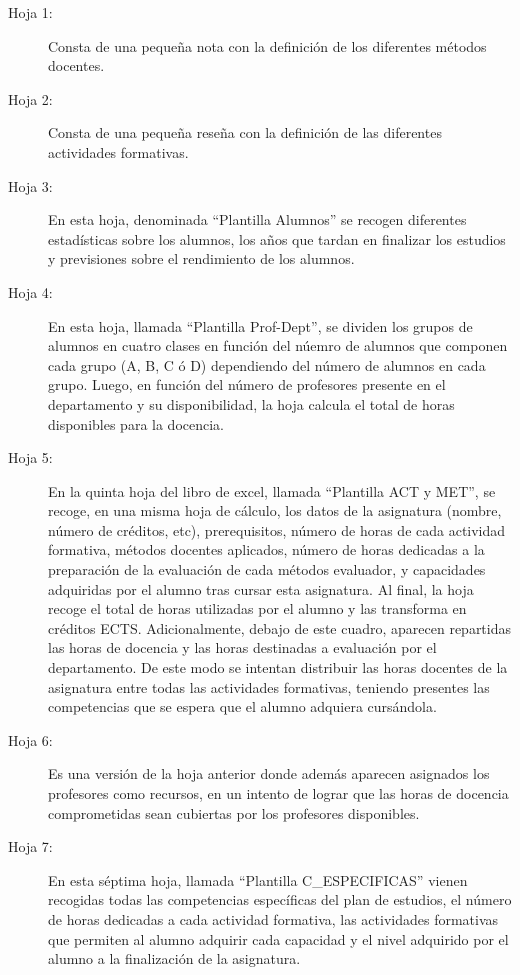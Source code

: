 		\begin{description}
			\item[Hoja 1:] Consta de una pequeña nota con la definición de los diferentes métodos docentes.

			\item[Hoja 2:] Consta de una pequeña reseña con la definición de las diferentes	actividades formativas.

			\item[Hoja 3:] En esta hoja, denominada "`Plantilla Alumnos"' se recogen diferentes estadísticas sobre los alumnos, los años que tardan en finalizar los estudios y previsiones sobre el rendimiento de los alumnos.

			\item[Hoja 4:] En esta hoja, llamada "`Plantilla Prof-Dept"', se dividen los grupos de alumnos en cuatro clases en función del núemro de alumnos que componen cada grupo (A, B, C ó D) dependiendo del número de alumnos en cada grupo. Luego, en función del número de profesores presente en el departamento y su disponibilidad, la hoja calcula el total de horas disponibles para la docencia.

			\item[Hoja 5:] En la quinta hoja del libro de excel, llamada "`Plantilla ACT y MET"', se recoge, en una misma hoja de cálculo, los datos de la asignatura (nombre, número de créditos, etc), prerequisitos, número de horas de cada actividad formativa, métodos docentes aplicados, número de horas dedicadas a la preparación de la evaluación de cada métodos evaluador, y capacidades adquiridas por el alumno tras cursar esta asignatura. Al final, la hoja recoge el total de horas utilizadas por el alumno y las transforma en créditos ECTS. Adicionalmente, debajo de este cuadro, aparecen repartidas las horas de docencia y las horas destinadas a evaluación por el departamento. De este modo se intentan distribuir las horas docentes de la asignatura entre todas las actividades formativas, teniendo presentes las competencias que se espera que el alumno adquiera cursándola.

			\item[Hoja 6:] Es una versión de la hoja anterior donde además aparecen asignados los profesores como recursos, en un intento de lograr que las horas de docencia comprometidas sean cubiertas por los profesores disponibles.

			\item[Hoja 7:] En esta séptima hoja, llamada "`Plantilla C\_ESPECIFICAS"' vienen recogidas todas las competencias específicas del plan de estudios, el número de horas dedicadas a cada actividad formativa, las actividades formativas que permiten al alumno adquirir cada capacidad y el nivel adquirido por el alumno a la finalización de la asignatura.


\end{description}
